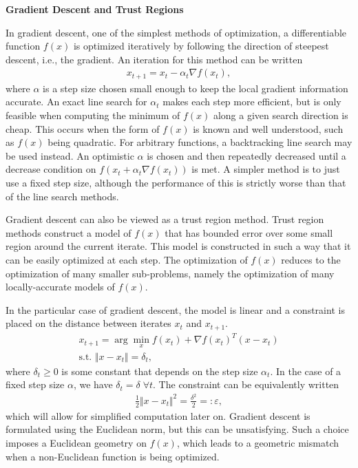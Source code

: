 \documentclass[twoside,10pt]{article}
\newcommand{\subheader}[1]{\bigskip\begin{center}\textbf{#1}\end{center}}
\begin{document}
\subheader{Gradient Descent and Trust Regions}
In gradient descent, one of the simplest methods of optimization, a differentiable function $f(x)$ is optimized iteratively by following the direction of steepest descent, i.e., the gradient. An iteration for this method can be written
\begin{gather*}
    x_{t+1} = x_t - \alpha_t \nabla f(x_t),
\end{gather*}
where $\alpha$ is a step size chosen small enough to keep the local gradient information accurate. An exact line search for $\alpha_t$ makes each step more efficient, but is only feasible when computing the minimum of $f(x)$ along a given search direction is cheap. This occurs when the form of $f(x)$ is known and well understood, such as $f(x)$ being quadratic. For arbitrary functions, a backtracking line search may be used instead. An optimistic $\alpha$ is chosen and then repeatedly decreased until a decrease condition on $f(x_t + \alpha_t \nabla f(x_t))$ is met. A simpler method is to just use a fixed step size, although the performance of this is strictly worse than that of the line search methods.

Gradient descent can also be viewed as a trust region method.\cite{tr} Trust region methods construct a model of $f(x)$ that has bounded error over some small region around the current iterate. This model is constructed in such a way that it can be easily optimized at each step. The optimization of $f(x)$ reduces to the optimization of many smaller sub-problems, namely the optimization of many locally-accurate models of $f(x)$.

In the particular case of gradient descent, the model is linear and a constraint is placed on the distance between iterates $x_t$ and $x_{t+1}$.
\begin{gather*}
    x_{t+1} = \arg\min_x f(x_t) + \nabla f(x_t)^T (x-x_t) \\
    \text{s.t. } \Vert x - x_t \Vert = \delta_t,
\end{gather*}
where $\delta_t \geq 0$ is some constant that depends on the step size $\alpha_t$. In the case of a fixed step size $\alpha$, we have $\delta_t = \delta \; \forall t$. The constraint can be equivalently written
\begin{gather*}
    \frac{1}{2} \Vert x - x_t \Vert^2 = \frac{\delta^2}{2} =: \varepsilon,
\end{gather*}
which will allow for simplified computation later on. Gradient descent is formulated using the Euclidean norm, but this can be unsatisfying. Such a choice imposes a Euclidean geometry on $f(x)$, which leads to a geometric mismatch when a non-Euclidean function is being optimized.
\end{document}
